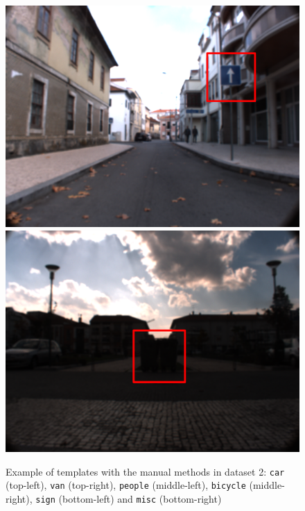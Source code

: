 \begin{figure}[htp]
	\includegraphics[width=.49\textwidth]{capresults/imgs/sign3.png}
	\includegraphics[width=.49\textwidth]{capresults/imgs/misc2.png}
	
	\caption{Example of templates with the manual methods in dataset 2:  \texttt{car} (top-left), \texttt{van} (top-right), \texttt{people} (middle-left), \texttt{bicycle} (middle-right), \texttt{sign} (bottom-left) and \texttt{misc} (bottom-right)}
	\label{fig:dataset2results2}
	
\end{figure}











